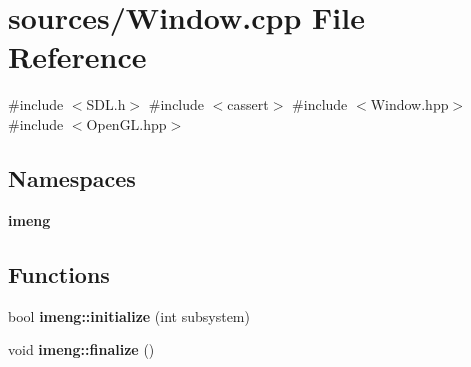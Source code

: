 \section{sources/\+Window.cpp File Reference}
\label{_window_8cpp}
{\ttfamily \#include $<$S\+D\+L.\+h$>$}\newline
{\ttfamily \#include $<$cassert$>$}\newline
{\ttfamily \#include $<$Window.\+hpp$>$}\newline
{\ttfamily \#include $<$Open\+G\+L.\+hpp$>$}\newline
\subsection*{Namespaces}
\begin{DoxyCompactItemize}
\item 
 \textbf{ imeng}
\end{DoxyCompactItemize}
\subsection*{Functions}
\begin{DoxyCompactItemize}
\item 
bool \textbf{ imeng\+::initialize} (int subsystem)
\item 
void \textbf{ imeng\+::finalize} ()
\end{DoxyCompactItemize}
